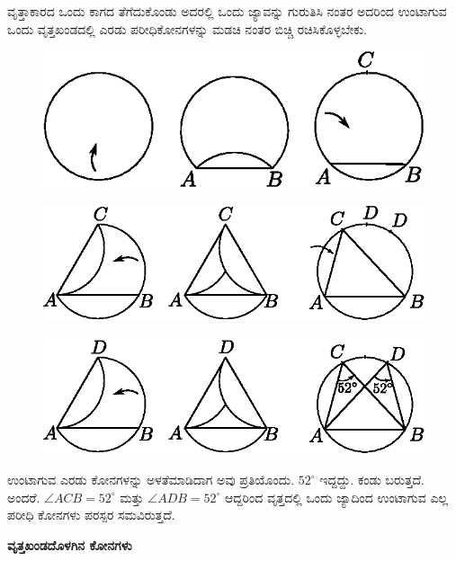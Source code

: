  ವೃತ್ತಾಕಾರದ ಒಂದು ಕಾಗದ ತೆಗೆದುಕೊಂಡು ಅದರಲ್ಲಿ ಒಂದು ಜ್ಯಾವನ್ನು ಗುರುತಿಸಿ ನಂತರ ಅದರಿಂದ ಉಂಟಾಗುವ ಒಂದು ವೃತ್ತಖಂಡದಲ್ಲಿ ಎರಡು ಪರೀಧಿಕೋನಗಳನ್ನು ಮಡಚಿ ನಂತರ ಬಿಚ್ಚಿ ರಚಿಸಿಕೊಳ್ಳಬೇಕು.
 \begin{figure}[H]
\centering
\includegraphics[scale=.98]{src/figure/chap1/fig1-28a.eps}
\end{figure}
 \begin{figure}[H]
\centering
\includegraphics[scale=.98]{src/figure/chap1/fig1-28b.eps}
\end{figure}
\begin{figure}[H]
\centering
\includegraphics[scale=.98]{src/figure/chap1/fig1-28c.eps}
\end{figure}

 ಉಂಟಾಗುವ ಎರಡು ಕೋನಗಳನ್ನು ಅಳತೆಮಾಡಿದಾಗ ಅವು ಪ್ರತಿಯೊಂದು. $52^\circ$ ಇದ್ದದ್ದು. ಕಂಡು ಬರುತ್ತದೆ. ಅಂದರೆ. $\angle ACB = 52^\circ$ ಮತ್ತು  $\angle ADB = 52^\circ$ ಆದ್ದರಿಂದ ವೃತ್ತದಲ್ಲಿ ಒಂದು ಜ್ಯಾದಿಂದ ಉಂಟಾಗುವ ಎಲ್ಲ ಪರೀಧಿ ಕೋನಗಳು ಪರಸ್ಪರ ಸಮವಿರುತ್ತದೆ. 
 
 \medskip
 \noindent
  \textbf{ವೃತ್ತಖಂಡದೊಳಗಿನ ಕೋನಗಳು}
  
